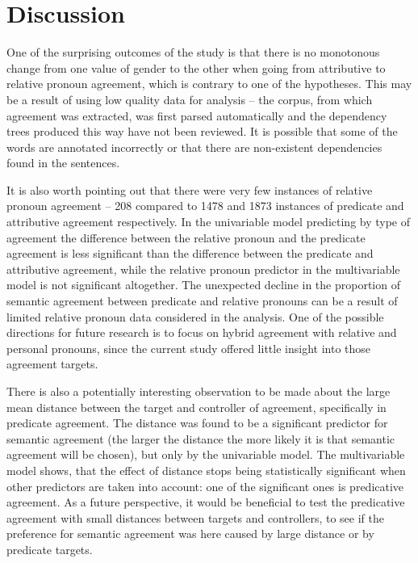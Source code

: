 \chapter{Discussion}
\startcontents[chapters]

One of the surprising outcomes of the study is that there is no monotonous change from one value of gender to the other when going from attributive to relative pronoun agreement, which is contrary to one of the hypotheses. This may be a result of using low quality data for analysis -- the corpus, from which agreement was extracted, was first parsed automatically and the dependency trees produced this way have not been reviewed. It is possible that some of the words are annotated incorrectly or that there are non-existent dependencies found in the sentences.

It is also worth pointing out that there were very few instances of relative pronoun agreement -- 208 compared to 1478 and 1873 instances of predicate and attributive agreement respectively. In the univariable model predicting by type of agreement the difference between the relative pronoun and the predicate agreement is less significant than the difference between the predicate and attributive agreement, while the relative pronoun predictor in the multivariable model is not significant altogether. The unexpected decline in the proportion of semantic agreement between predicate and relative pronouns can be a result of limited relative pronoun data considered in the analysis. One of the possible directions for future research is to focus on hybrid agreement with relative and personal pronouns, since the current study offered little insight into those agreement targets.

There is also a potentially interesting observation to be made about the large mean distance between the target and controller of agreement, specifically in predicate agreement. The distance was found to be a significant predictor for semantic agreement (the larger the distance the more likely it is that semantic agreement will be chosen), but only by the univariable model. The multivariable model shows, that the effect of distance stops being statistically significant when other predictors are taken into account: one of the significant ones is predicative agreement. As a future perspective, it would be beneficial to test the predicative agreement with small distances between targets and controllers, to see if the preference for semantic agreement was here caused by large distance or by predicate targets.

